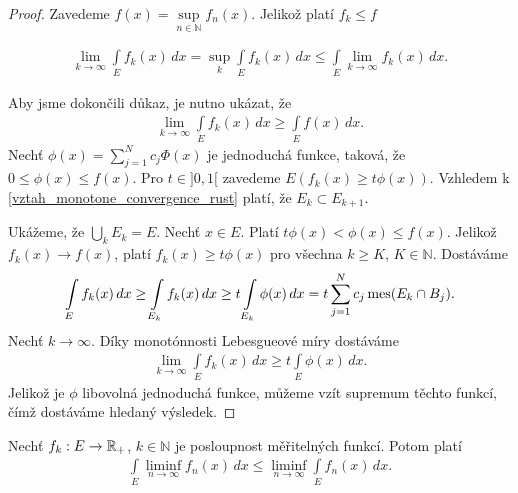 \begin{proof}
Zavedeme $f(x)=\sup \limits _{n \in \mathbb{N}}f_n(x)$. Jelikož platí $f_k \leq f$

\begin{align*}
\lim \limits _{k \to \infty} \int \limits _E f_k(x) \, dx = \sup _{k} \int \limits _E f_k (x) \, dx  \leq \int \limits _E \lim \limits _{k \to \infty} f_k(x) \, dx .
\end{align*}



Aby jsme dokončili důkaz, je nutno ukázat, že 
\begin{align*}
\lim \limits _{k \to \infty} \int \limits _E f_k(x) \, dx \geq \int \limits _E f(x) \, dx .
\end{align*}
Nechť $\phi(x)=\sum \limits _{j=1}^{N} c_j \Phi(x)$ je jednoduchá funkce, taková, že $0 \leq \phi(x)\leq f(x)$.
Pro $t \in ]0,1[$ zavedeme $E(f_k(x) \geq t \phi(x))$.
Vzhledem k \eqref{vztah_monotone_convergence_rust} platí, že $E_k \subset E_{k+1}$. 


Ukážeme, že $\bigcup \limits _{k} E_k=E$.
Nechť $x \in E$. Platí $t \phi(x) < \phi (x) \leq f(x)$. Jelikož $f_k(x) \to f(x)$, platí $f_k(x) \geq t\phi(x)$ pro všechna $k \geq K$, $K \in \mathbb{N}$. Dostáváme 
\begin{align*}
\int \limits _{E} f_k(x) \, dx \geq \int \limits _{E_k} f_k(x) \, dx \geq t \int \limits _{E_k} \phi(x) \, dx = t \sum \limits _{j=1}^{N}c_j \operatorname{mes}(E_k \cap B_j).
\end{align*}
Nechť $k \to \infty$. Díky monotónnosti Lebesgueové míry dostáváme
\begin{align*}
\lim \limits _{k \to \infty} \int \limits _{E} f_k(x) \, dx \geq t \int \limits _{E} \phi(x) \, dx.
\end{align*}
Jelikož je $\phi$ libovolná jednoduchá funkce, můžeme vzít supremum těchto funkcí, čímž dostáváme hledaný výsledek.
\end{proof}

\begin{theorem}[Fatou]
\label{veta_2.8_Fatou}
Nechť $f_k:E \to \mathbb{R}_+$, $k \in \mathbb{N}$ je posloupnost měřitelných funkcí. 
Potom platí 
\begin{align*}
\int \limits _E \liminf_{n \to \infty} f_n(x) \,dx \leq \liminf \limits _{n \to \infty} \int \limits _E f_n(x) \,dx.
\end{align*}
\end{theorem}

